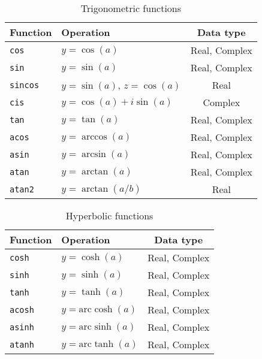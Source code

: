 \begin{table}
  \begin{tabularx}{\textwidth}{LLC}
    \toprule
    Function & Operation & Data type \\
    \midrule
    \texttt{cos}    & $y = \cos(a)$        & Real, Complex \\
    \texttt{sin}    & $y = \sin(a)$        & Real, Complex \\
    \texttt{sincos} & $y = \sin(a)$, $z = \cos(a)$ & Real  \\
    \texttt{cis}    & $y = \cos(a) + i\sin(a)$   & Complex \\
    \texttt{tan}    & $y = \tan(a)$        & Real, Complex \\
    \texttt{acos}   & $y = \arccos(a)$     & Real, Complex \\
    \texttt{asin}   & $y = \arcsin(a)$     & Real, Complex \\
    \texttt{atan}   & $y = \arctan(a)$     & Real, Complex \\
    \texttt{atan2}  & $y = \arctan(a / b)$ & Real          \\
    \bottomrule
  \end{tabularx}
  \caption{Trigonometric functions}
  \label{tab:Trigonometric functions}
\end{table}

\begin{table}
  \begin{tabularx}{\textwidth}{LLC}
    \toprule
    Function & Operation & Data type \\
    \midrule
    \texttt{cosh}  & $y = \cosh(a)$             & Real, Complex \\
    \texttt{sinh}  & $y = \sinh(a)$             & Real, Complex \\
    \texttt{tanh}  & $y = \tanh(a)$             & Real, Complex \\
    \texttt{acosh} & $y = \mathrm{arc}\cosh(a)$ & Real, Complex \\
    \texttt{asinh} & $y = \mathrm{arc}\sinh(a)$ & Real, Complex \\
    \texttt{atanh} & $y = \mathrm{arc}\tanh(a)$ & Real, Complex \\
    \bottomrule
  \end{tabularx}
  \caption{Hyperbolic functions}
  \label{tab:Hyperbolic functions}
\end{table}

